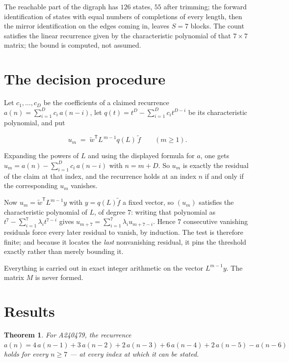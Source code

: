 \documentclass[11pt]{article}
\newtheorem{theorem}{Theorem}
\theoremstyle{definition}
\begin{document}
The reachable part of the digraph has $126$ states, $55$ after trimming; the forward identification of states with equal numbers of completions of every length, then the mirror identification on the edges coming in, leaves $S = 7$ blocks. The count satisfies the linear recurrence given by the characteristic polynomial of that $7\times7$ matrix; the bound is computed, not assumed.

\section{The decision procedure}

Let $c_1,\dots,c_D$ be the coefficients of a claimed recurrence $a(n) = \sum_{i=1}^{D} c_i\,a(n-i)$, let $q(t) = t^{D} - \sum_{i=1}^{D} c_i t^{D-i}$ be its characteristic polynomial, and put

\[u_m \;=\; \tilde w^{\mathsf T} L^{\,m-1} q(L)\,\tilde f \qquad (m \ge 1).\]

Expanding the powers of $L$ and using the displayed formula for $a$, one gets $u_m = a(n) - \sum_{i=1}^{D} c_i\,a(n-i)$ with $n = m + D$. So $u_m$ is exactly the residual of the claim at that index, and the recurrence holds at an index $n$ if and only if the corresponding $u_m$ vanishes.

Now $u_m = \tilde w^{\mathsf T} L^{m-1} y$ with $y = q(L)\tilde f$ a fixed vector, so $(u_m)$ satisfies the characteristic polynomial of $L$, of degree $7$: writing that polynomial as $t^{7} - \sum_{i=1}^{7} \lambda_i t^{7-i}$ gives $u_{m+7} = \sum_{i=1}^{7} \lambda_i u_{m+7-i}$. Hence $7$ consecutive vanishing residuals force every later residual to vanish, by induction. The test is therefore finite; and because it locates the {\itshape last} nonvanishing residual, it pins the threshold exactly rather than merely bounding it.

Everything is carried out in exact integer arithmetic on the vector $L^{m-1}y$. The matrix $M$ is never formed.

\section{Results}

\begin{theorem} For A240479, the recurrence $a(n) = 4\,a(n-1) + 3\,a(n-2) + 2\,a(n-3) + 6\,a(n-4) + 2\,a(n-5) - a(n-6)$ holds for every $n \ge 7$ --- at every index at which it can be stated.\end{theorem}
\end{document}
